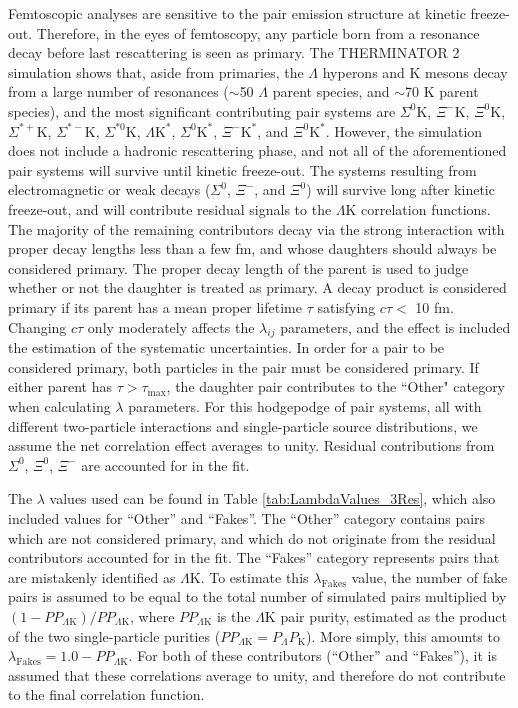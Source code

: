\documentclass[ALICE,manyauthors]{cernphprep}
\newcommand{\Lam}{$\Lambda$\xspace}
\newcommand{\LamK}{$\Lambda$K\xspace}
\begin{document}
Femtoscopic analyses are sensitive to the pair emission structure at kinetic freeze-out.
Therefore, in the eyes of femtoscopy, any particle born from a resonance decay before last rescattering is seen as primary.
The THERMINATOR 2 simulation shows that, aside from primaries, the \Lam hyperons and K mesons decay from a large number of resonances ($\sim$50 \Lam parent species, and $\sim$70 K parent species), and the most significant contributing pair systems are $\Sigma^{0}$K, $\Xi^{-}$K, $\Xi^{0}$K, $\Sigma^{*+}$K, $\Sigma^{*-}$K, $\Sigma^{*0}$K, $\Lambda\mathrm{K}^{*}$, $\Sigma^{0}\mathrm{K}^{*}$, $\Xi^{-}\mathrm{K}^{*}$, and $\Xi^{0}\mathrm{K}^{*}$.
However, the simulation does not include a hadronic rescattering phase, and not all of the aforementioned pair systems will survive until kinetic freeze-out.
The systems resulting from electromagnetic or weak decays ($\Sigma^{0}$, $\Xi^{-}$, and $\Xi^{0}$) will survive long after kinetic freeze-out, and will contribute residual signals to the \LamK correlation functions.
The majority of the remaining contributors decay via the strong interaction with proper decay lengths less than a few fm, and whose daughters should always be considered primary.
The proper decay length of the parent is used to judge whether or not the daughter is treated as primary.
A decay product is considered primary if its parent has a mean proper lifetime $\tau$ satisfying $c\tau <$ 10 fm.
Changing $c\tau$ only moderately affects the $\lambda_{ij}$ parameters, and the effect is included the estimation of the systematic uncertainties.
In order for a pair to be considered primary, both particles in the pair must be considered primary. 
If either parent has $\tau > \tau_{\mathrm{max}}$, the daughter pair contributes to the ``Other" category when calculating $\lambda$ parameters.
For this hodgepodge of pair systems, all with different two-particle interactions and single-particle source distributions, we assume the net correlation effect averages to unity.
Residual contributions from $\Sigma^{0}$, $\Xi^{0}$, $\Xi^{-}$ are accounted for in the fit.


 



The $\lambda$ values used can be found in Table \ref{tab:LambdaValues_3Res}, which also included values for ``Other'' and ``Fakes''.  
The ``Other'' category contains pairs which are not considered primary, and which do not originate from the residual contributors accounted for in the fit.  
The ``Fakes'' category represents pairs that are mistakenly identified as \LamK.  
To estimate this $\lambda_{\mathrm{Fakes}}$ value, the number of fake pairs is assumed to be equal to the total number of simulated pairs multiplied by $(1-PP_{\Lambda\mathrm{K}})/PP_{\Lambda\mathrm{K}}$, where $PP_{\Lambda\mathrm{K}}$ is the \LamK pair purity, estimated as the product of the two single-particle purities ($PP_{\Lambda\mathrm{K}} = P_{\Lambda}P_{\mathrm{K}}$).
More simply, this amounts to $\lambda_{\mathrm{Fakes}} = 1.0-PP_{\Lambda\mathrm{K}}$.
For both of these contributors (``Other'' and ``Fakes''), it is assumed that these correlations average to unity, and therefore do not contribute to the final correlation function.
\end{document}

